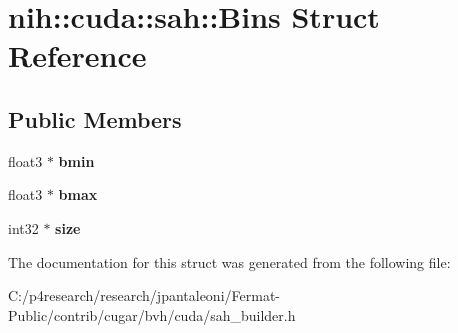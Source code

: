 \hypertarget{structnih_1_1cuda_1_1sah_1_1_bins}{}\section{nih\+:\+:cuda\+:\+:sah\+:\+:Bins Struct Reference}
\label{structnih_1_1cuda_1_1sah_1_1_bins}
\subsection*{Public Members}
\begin{DoxyCompactItemize}
\item 
\mbox{\label{structnih_1_1cuda_1_1sah_1_1_bins_a1d6393400801094d517a421c31cdefc3}} 
float3 $\ast$ {\bfseries bmin}
\item 
\mbox{\label{structnih_1_1cuda_1_1sah_1_1_bins_a8aefd1cf7d81965ca5ac1d31dd8c07c2}} 
float3 $\ast$ {\bfseries bmax}
\item 
\mbox{\label{structnih_1_1cuda_1_1sah_1_1_bins_aac1f8944e8692600f9fe1e164061f6e3}} 
int32 $\ast$ {\bfseries size}
\end{DoxyCompactItemize}


The documentation for this struct was generated from the following file\+:\begin{DoxyCompactItemize}
\item 
C\+:/p4research/research/jpantaleoni/\+Fermat-\/\+Public/contrib/cugar/bvh/cuda/sah\+\_\+builder.\+h\end{DoxyCompactItemize}
